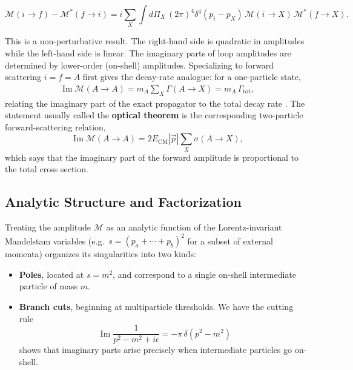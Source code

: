\begin{theorem}
    \label{fact:generalized-optical-theorem}
    \[
        \mathcal{M}(i \to f) - \mathcal{M}^*(f \to i)
        = i \sum_X \int d\Pi_X\, (2\pi)^4 \delta^4(p_i - p_X)\,
        \mathcal{M}(i \to X)\, \mathcal{M}^*(f \to X).
    \]
\end{theorem}

This is a non-perturbative result. The right-hand side is quadratic in amplitudes while the left-hand side is linear. The imaginary parts of loop amplitudes are determined by lower-order (on-shell) amplitudes. Specializing to forward scattering $i = f = A$ first gives the decay-rate analogue: for a one-particle state,
\begin{align}
    \operatorname{Im}\mathcal{M}(A \to A) = m_A \sum_X \Gamma(A \to X) = m_A\, \Gamma_{\text{tot}},
\end{align}
relating the imaginary part of the exact propagator to the total decay rate \autocite[(24.13)]{schwartzQFT2014}. The statement usually called the \textbf{optical theorem} is the corresponding two-particle forward-scattering relation,
\[
    \operatorname{Im}\mathcal{M}(A \to A) = 2 E_{\text{CM}} |\vec{p}|\sum_X \sigma(A \to X),
\]
which says that the imaginary part of the forward amplitude is proportional to the total cross section.

\subsection{Analytic Structure and Factorization}
\label{subsec:analytic-structure-and-factorization}

Treating the amplitude $\mathcal{M}$ as an analytic function of the Lorentz-invariant Mandelstam variables (e.g.\ $s = (p_a + \cdots + p_b)^2$ for a subset of external momenta) organizes its singularities into two kinds:
\begin{itemize}
    \item \textbf{Poles}, located at $s = m^2$, and correspond to a single on-shell intermediate particle of mass $m$.
    \item \textbf{Branch cuts}, beginning at multiparticle thresholds. We have the cutting rule
    \[
        \operatorname{Im}\frac{1}{p^2 - m^2 + i\epsilon} = -\pi\, \delta(p^2 - m^2)
    \]
    \autocite[(24.25)]{schwartzQFT2014} shows that imaginary parts arise precisely when intermediate particles go on-shell.
\end{itemize}


